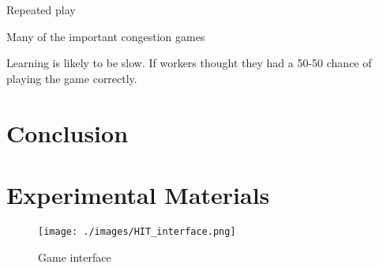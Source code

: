 \documentclass[11pt]{article}
\begin{document}
Repeated play 

Many of the important congestion games 

Learning is likely to be slow. 
If workers thought they had a 50-50 chance of playing the game correctly. 


\section{Conclusion} 





\appendix 

\section{Experimental Materials} 

\begin{figure} 
\centering 
\caption{Game interface} 
\begin{minipage}{0.85 \linewidth}
\texttt{[image: ./images/HIT\_interface.png]}
\end{minipage} 
\end{figure}  
\end{document}
